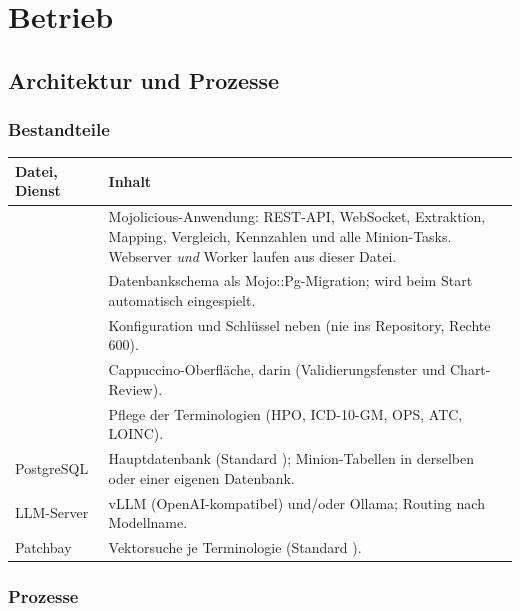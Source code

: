 \documentclass[11pt,a4paper,parskip=half-,headings=standardclasses,toc=bibliography,open=any]{scrreprt}
\begin{document}
\part{Betrieb}\label{part:betrieb}

\chapter{Architektur und Prozesse}\label{kap:architektur}

\section{Bestandteile}

\begin{tabularx}{\textwidth}{@{}P{5.0cm}L@{}}
\toprule
\textbf{Datei, Dienst} & \textbf{Inhalt}\\
\midrule
{} & Mojolicious-Anwendung: REST-API, WebSocket, Extraktion, Mapping, Vergleich, Kennzahlen und alle Minion-Tasks. Webserver \emph{und} Worker laufen aus dieser Datei.\\
 & Datenbankschema als Mojo::Pg-Migration; wird beim Start automatisch eingespielt.\\
 & Konfiguration und Schlüssel neben  (nie ins Repository, Rechte 600).\\
 & Cappuccino-Oberfläche, darin  (Validierungsfenster und Chart-Review).\\
 & Pflege der Terminologien (HPO, ICD-10-GM, OPS, ATC, LOINC).\\
PostgreSQL & Hauptdatenbank (Standard ); Minion-Tabellen in derselben oder einer eigenen Datenbank.\\
LLM-Server & vLLM (OpenAI-kompatibel) und/oder Ollama; Routing nach Modellname.\\
Patchbay & Vektorsuche je Terminologie (Standard ).\\
\bottomrule
\end{tabularx}

\section{Prozesse}
\end{document}
